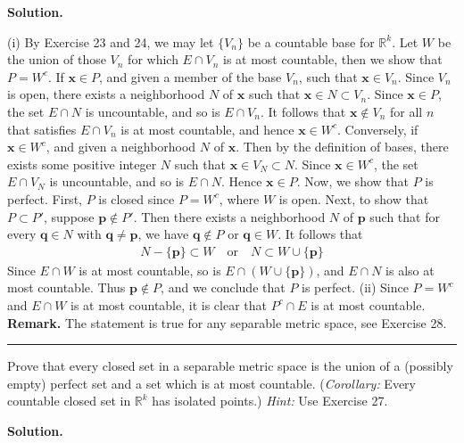 \documentclass[12pt]{article}
\theoremstyle{definition}
\begin{document}
\smallskip
\noindent\textbf{Solution.}\quad

(i) By Exercise 23 and 24, we may let $\{V_n\}$ be a countable base for $\mathbb{R}^k$. Let $W$ be the union of those $V_n$ for which $E\cap V_n$ is at most countable, then we show that $P=W^c$. If $\mathbf{x}\in P$, and given a member of the base $V_n$, such that $\mathbf{x}\in V_n$. Since $V_n$ is open, there exists a neighborhood $N$ of $\mathbf{x}$ such that $\mathbf{x}\in N\subset V_n$. Since $\mathbf{x}\in P$, the set $E\cap N$ is uncountable, and so is $E\cap V_n$. It follows that $\mathbf{x}\notin V_n$ for all $n$ that satisfies $E\cap V_n$ is at most countable, and hence $\mathbf{x}\in W^c$. Conversely, if $\mathbf{x}\in W^c$, and given a neighborhood $N$ of $\mathbf{x}$. Then by the definition of bases, there exists some positive integer $N$ such that $\mathbf{x}\in V_N\subset N$. Since $\mathbf{x}\in W^c$, the set $E\cap V_N$ is uncountable, and so is $E\cap N$. Hence $\mathbf{x}\in P$.
Now, we show that $P$ is perfect. First, $P$ is closed since $P=W^c$, where $W$ is open. Next, to show that $P\subset P'$, suppose $\mathbf{p}\notin P'$. Then there exists a neighborhood $N$ of $\mathbf{p}$ such that for every $\mathbf{q}\in N$ with $\mathbf{q}\ne \mathbf{p}$, we have $\mathbf{q}\notin P$ or $\mathbf{q}\in W$. It follows that
\begin{align*}
N-\{\mathbf{p}\}\subset W\quad\mbox{or}\quad N\subset W\cup\{\mathbf{p}\}
\end{align*}
Since $E\cap W$ is at most countable, so is $E\cap\left(W\cup\{\mathbf{p}\}\right)$, and $E\cap N$ is also at most countable. Thus $\mathbf{p}\notin P$, and we conclude that $P$ is perfect.
(ii) Since $P=W^c$ and $E\cap W$ is at most countable, it is clear that $P^c\cap E$ is at most countable.
\textbf{Remark.} The statement is true for any separable metric space, see Exercise 28.



\bigskip\noindent\hrule\bigskip

Prove that every closed set in a separable metric space is the union of a (possibly empty) perfect set and a set which is at most countable. (\textit{Corollary:} Every countable closed set in $\mathbb{R}^k$ has isolated points.) \textit{Hint:} Use Exercise 27.

\smallskip
\noindent\textbf{Solution.}\quad
\end{document}
